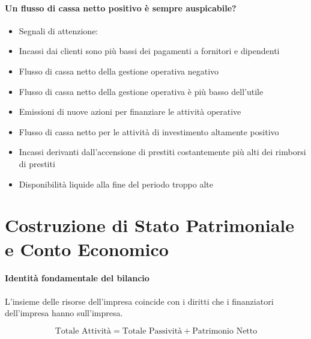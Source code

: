 \paragraph{Un flusso di cassa netto positivo è sempre auspicabile?}
\begin{itemize}
    \item Segnali di attenzione:
    \item Incassi dai clienti sono più bassi dei pagamenti a fornitori e dipendenti
    \item Flusso di cassa netto della gestione operativa negativo
    \item Flusso di cassa netto della gestione operativa è più basso dell’utile
    \item Emissioni di nuove azioni per finanziare le attività operative
    \item Flusso di cassa netto per le attività di investimento altamente positivo
    \item Incassi derivanti dall’accensione di prestiti costantemente più alti dei
    rimborsi di prestiti
    \item Disponibilità liquide alla fine del periodo troppo alte
\end{itemize}

\section{Costruzione di Stato Patrimoniale e Conto Economico}

\paragraph{Identità fondamentale del bilancio}
L’insieme delle risorse dell’impresa coincide con i diritti che i finanziatori
dell’impresa hanno sull’impresa.

\begin{equation*}
    \text{Totale Attività} = \text{Totale Passività} + \text{Patrimonio Netto}
\end{equation*}

